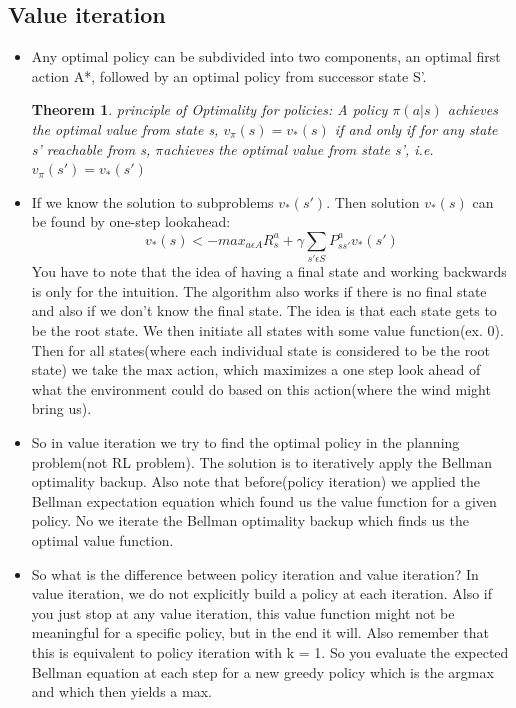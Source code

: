 \documentclass[a4paper]{article}
\newtheorem{theorem}{Theorem}
\begin{document}
\subsection{Value iteration}
\begin{itemize}
    \item Any optimal policy can be subdivided into two components, an optimal first action A*, followed by an optimal policy from successor state S'. 
    \begin{theorem}
    principle of Optimality for policies: 
    A policy $\pi(a|s)$ achieves the optimal value from state s, $v_{\pi}(s) = v_*(s)$ if and only if for any state s' reachable from s, $\pi$achieves the optimal value from state s', i.e. $v_{\pi}(s') = v_*(s')$
    \end{theorem}
    \item If we know the solution to subproblems $v_*(s')$. Then solution $v_*(s)$ can be found by one-step lookahead: 
    $$v_*(s) <- max_{a \epsilon A} R_s^a + \gamma \sum_{s'\epsilon S}P_{ss'}^a v_*(s')$$
    You have to note that the idea of having a final state and working backwards is only for the intuition. The algorithm also works if there is no final state and also if we don't know the final state. 
    \newline
    The idea is that each state gets to be the root state. We then initiate all states with some value function(ex. 0). Then for all states(where each individual state is considered to be the root state) we take the max action, which maximizes a one step look ahead of what the environment could do based on this action(where the wind might bring us). 
    \item So in value iteration we try to find the optimal policy in the planning problem(not RL problem). The solution is to iteratively apply the Bellman optimality backup. Also note that before(policy iteration) we applied the Bellman expectation equation which found us the value function for a given policy. No we iterate the Bellman optimality backup which finds us the optimal value function. 
    \item So what is the difference between policy iteration and value iteration? In value iteration, we do not explicitly build a policy at each iteration. Also if you just stop at any value iteration, this value function might not be meaningful for a specific policy, but in the end it will. Also remember that this is equivalent to policy iteration with k = 1. So you evaluate the expected Bellman equation at each step for a new greedy policy which is the argmax and which then yields a max. 

\end{itemize}
\end{document}
